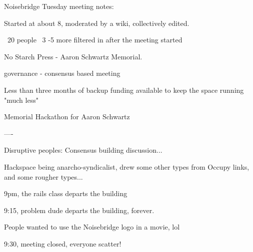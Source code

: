 Noisebridge Tuesday meeting notes:

Started at about 8, moderated by a wiki, collectively edited.

~20 people ~3 -5 more filtered in after the meeting started

No Starch Press - Aaron Schwartz Memorial.

governance - consensus based meeting

Less than three months of backup funding available to keep the space running
"much less"

Memorial Hackathon for Aaron Schwartz

----

Disruptive peoples: Consensus building discussion...

Hackspace being anarcho-syndicalist, drew some other types from Occupy links, and some rougher types...

9pm, the rails class departs the building

9:15, problem dude departs the building, forever.

People wanted to use the Noisebridge logo in a movie, lol

9:30, meeting closed, everyone scatter!